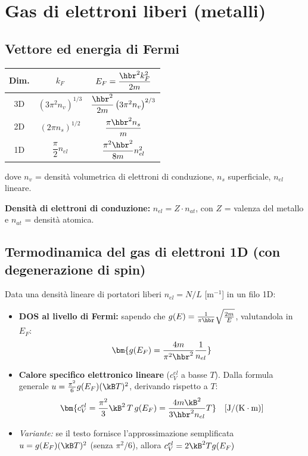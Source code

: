 \newpage
\section{Gas di elettroni liberi (metalli)}

\subsection{Vettore ed energia di Fermi}
\begin{center}
\renewcommand{\arraystretch}{1.8}
\begin{tabular}{c c c}
\toprule
Dim. & $k_F$ & $E_F = \dfrac{\hbr^2k_F^2}{2m}$ \\
\midrule
3D & $\left(3\pi^2 n_v\right)^{1/3}$ & $\dfrac{\hbr^2}{2m}\left(3\pi^2n_v\right)^{2/3}$ \\
2D & $\left(2\pi n_s\right)^{1/2}$ & $\dfrac{\pi\hbr^2 n_s}{m}$ \\
1D & $\dfrac{\pi}{2}n_{el}$ & $\dfrac{\pi^2\hbr^2}{8m}n_{el}^2$ \\
\bottomrule
\end{tabular}
\end{center}
dove $n_v$ = densità volumetrica di elettroni di conduzione, $n_s$ superficiale, $n_{el}$ lineare.

\textbf{Densità di elettroni di conduzione:} $n_{el} = Z\cdot n_{at}$, con $Z$ = valenza del metallo e $n_{at}$ = densità atomica.

\subsection{Termodinamica del gas di elettroni 1D (con degenerazione di spin)}
Data una densità lineare di portatori liberi $n_{el}=N/L$ [m$^{-1}$] in un filo 1D:
\begin{itemize}
    \setlength{\itemsep}{1pt}
    \item \textbf{DOS al livello di Fermi:} sapendo che $g(E)=\frac{1}{\pi\hbr}\sqrt{\frac{2m}{E}}$, valutandola in $E_F$:
    \[ \bm{g(E_F) = \frac{4m}{\pi^2\hbr^2}\frac{1}{n_{el}}} \]
    \item \textbf{Calore specifico elettronico lineare} ($c_V^{el}$ a basse $T$). Dalla formula generale $u=\frac{\pi^2}{6}g(E_F)(\kB T)^2$, derivando rispetto a $T$:
    \[ \bm{c_V^{el} = \frac{\pi^2}{3}\kB^2\,T\,g(E_F) = \frac{4m\kB^2}{3\hbr^2 n_{el}}T} \quad [\text{J}/(\text{K}\cdot\text{m})] \]
    \item \textit{Variante:} se il testo fornisce l'approssimazione semplificata $u = g(E_F)(\kB T)^2$ (senza $\pi^2/6$), allora $c_V^{el}=2\kB^2Tg(E_F)$
\end{itemize}

